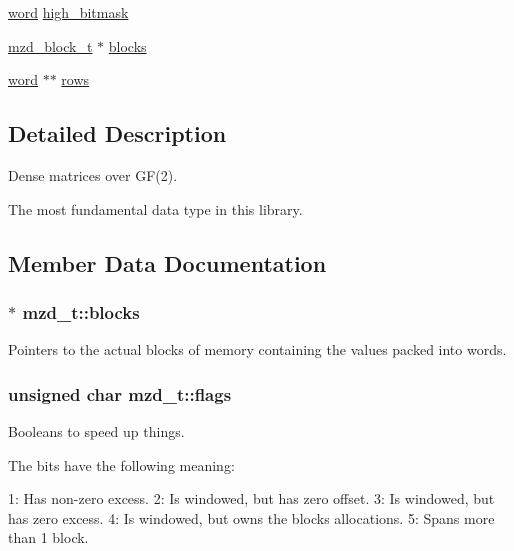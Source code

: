 \begin{DoxyCompactItemize}
\item 
\hyperlink{misc_8h_a8829cde3436decd2d2c3d99ed7d649f1}{word} \hyperlink{structmzd__t_ae4810dc31efe46823859366b6027d6b2}{high\+\_\+bitmask}
\item 
\hyperlink{structmzd__block__t}{mzd\+\_\+block\+\_\+t} $\ast$ \hyperlink{structmzd__t_aff749916040f8301cd9b00624b7869a4}{blocks}
\item 
\hyperlink{misc_8h_a8829cde3436decd2d2c3d99ed7d649f1}{word} $\ast$$\ast$ \hyperlink{structmzd__t_ae809b9c25df0752caabe8233209dd447}{rows}
\end{DoxyCompactItemize}


\subsection{Detailed Description}
Dense matrices over G\+F(2). 

The most fundamental data type in this library. 

\subsection{Member Data Documentation}
\hypertarget{structmzd__t_aff749916040f8301cd9b00624b7869a4}{}
\subsubsection[{blocks}]{$\ast$ mzd\+\_\+t\+::blocks}\label{structmzd__t_aff749916040f8301cd9b00624b7869a4}
Pointers to the actual blocks of memory containing the values packed into words. \hypertarget{structmzd__t_a71bc6ea4f80c3afdf430a416074459f0}{}
\subsubsection[{flags}]{\setlength{\rightskip}{0pt plus 5cm}unsigned char mzd\+\_\+t\+::flags}\label{structmzd__t_a71bc6ea4f80c3afdf430a416074459f0}


Booleans to speed up things. 

The bits have the following meaning\+:

1\+: Has non-\/zero excess. 2\+: Is windowed, but has zero offset. 3\+: Is windowed, but has zero excess. 4\+: Is windowed, but owns the blocks allocations. 5\+: Spans more than 1 block. \hypertarget{structmzd__t_ae4810dc31efe46823859366b6027d6b2}{}
